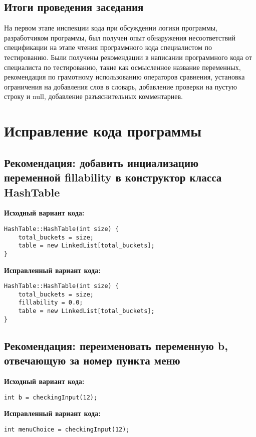 \documentclass[11pt,a4paper,final]{article} %
\begin{document}
\subsection{Итоги проведения заседания}
На первом этапе инспекции кода при обсуждении логики программы, разработчиком программы, был получен опыт обнаружения несоответствий спецификации на этапе чтения программного кода специалистом по тестированию. Были получены рекомендации в написании программного кода от специалиста по тестированию, такие как осмысленное название переменных, рекомендация по грамотному использованию операторов сравнения, установка ограничения на добавления слов в словарь, добавление проверки на пустую строку и null, добавление разъяснительных комментариев.


\newpage
\section{Исправление кода программы}

\subsection{Рекомендация: добавить инциализацию переменной fillability в конструктор класса HashTable}

\begin{minipage}[t]{0.48\textwidth}
	
\textbf{Исходный вариант кода:}
\begin{lstlisting}
HashTable::HashTable(int size) {
	total_buckets = size;
	table = new LinkedList[total_buckets];
}
\end{lstlisting}
\end{minipage}
\hfill %
\begin{minipage}[t]{0.48\textwidth}
\textbf{Исправленный вариант кода:}

\begin{lstlisting}
HashTable::HashTable(int size) {
	total_buckets = size;
	fillability = 0.0;
	table = new LinkedList[total_buckets];
}
\end{lstlisting}
\end{minipage}

\subsection{Рекомендация: переименовать переменную b, отвечающую за номер пункта меню}

\begin{minipage}[t]{0.48\textwidth}
\textbf{Исходный вариант кода:}
\begin{lstlisting}
int b = checkingInput(12);
\end{lstlisting}
\end{minipage}
\hfill %
\begin{minipage}[t]{0.48\textwidth}
\textbf{Исправленный вариант кода:}

\begin{lstlisting}
int menuChoice = checkingInput(12);
\end{lstlisting}
\end{minipage}
\end{document}

